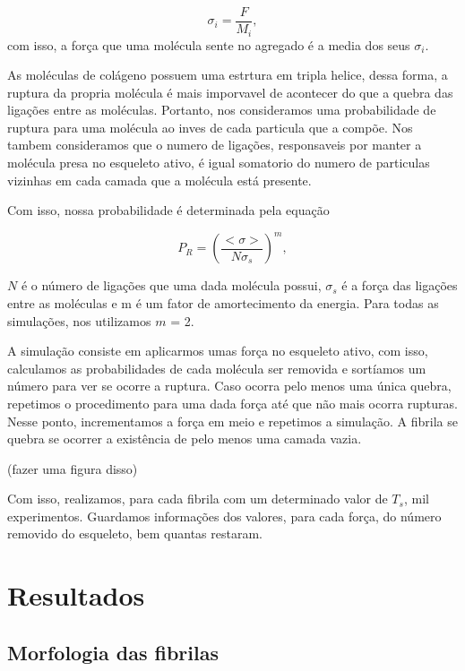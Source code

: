 \documentclass{article}
\begin{document}
        \begin{equation}
            \sigma_{i} = \frac{F}{M_{i}},
        \end{equation}
        \noindent com isso, a força que uma molécula sente no agregado é a media dos seus $\sigma_{i}$.

        As moléculas de colágeno possuem uma estrtura em tripla helice\cite{BRODSKY1997545}, dessa forma, a ruptura da propria molécula é mais imporvavel 
        de acontecer do que a quebra das ligações entre as moléculas\cite{Parkinson1997}. Portanto, nos consideramos uma probabilidade de ruptura para uma
        molécula ao inves de cada particula que a compõe. Nos tambem consideramos que o numero de ligações, responsaveis por manter a molécula presa no 
        esqueleto ativo, é igual somatorio do numero de particulas vizinhas em cada camada que a molécula está presente.

        Com isso, nossa probabilidade é determinada pela equação

        \begin{equation}
            P_{R} = (\frac{<\sigma>}{N\sigma_{s}})^{m},
        \end{equation}

        \noindent $N$ é o número de ligações que uma dada molécula possui, $\sigma_{s}$ é a força das ligações entre as moléculas e m é um fator de 
        amortecimento da energia\cite{Parkinson1997,2013}. Para todas as simulações, nos utilizamos $m$ = 2.

        A simulação consiste em aplicarmos umas força no esqueleto ativo, com isso, calculamos as probabilidades de cada molécula ser removida e sortíamos um número para ver se ocorre a ruptura. Caso ocorra pelo menos uma única quebra, repetimos o procedimento para uma dada força até que não mais ocorra rupturas. Nesse ponto, incrementamos a força em meio e repetimos a simulação. A fibrila se quebra se ocorrer a existência de pelo menos uma camada vazia.

        (fazer uma figura disso)

        Com isso, realizamos, para cada fibrila com um determinado valor de $T_{s}$, mil experimentos. Guardamos informações dos valores, para cada força, do número removido do esqueleto, bem quantas restaram.


\section{Resultados}
    \subsection{Morfologia das fibrilas}
\end{document}
